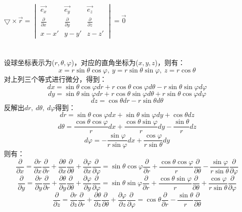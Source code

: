 \documentclass[10.5pt]{article}
\begin{document}
\subsection{}
$\bigtriangledown \times \vec{r} = 
\begin{vmatrix}
    \vec{e_x} & \vec{e_y} & \vec{e_z}\\
    \frac{\partial}{\partial x} & \frac{\partial}{\partial y} & \frac{\partial}{\partial z}\\
    x-x' & y-y' & z-z'
\end{vmatrix}
=\vec{0}
$

\section{}
设球坐标表示为($r,\theta,\varphi$)，对应的直角坐标为($x,y,z$)，则有：$$ x = r\sin \theta \cos \varphi, ~  y = r\sin \theta \sin \varphi, ~ z = r\cos \theta $$\indent 
对上列三个等式进行微分，得到：
$$dx = \sin \theta \cos \varphi dr + r\cos \theta \cos \varphi d\theta - r\sin \theta \sin \varphi d\varphi $$
$$dy = \sin \theta \sin \varphi dr + r\cos \theta \sin \varphi d\theta + r\sin \theta \cos \varphi d\varphi $$
$$dz = \cos \theta dr - r\sin \theta d\theta $$\indent
反解出$dr,~d\theta,~d\varphi$得到：
$$dr = \sin \theta \cos \varphi dx + \sin \theta \sin \varphi dy + \cos \theta dz$$
$$d\theta = \frac{\cos \theta \cos \varphi }{r}dx + \frac{\cos \theta \sin \varphi }{r}dy - \frac{\sin \theta}{r}dz$$
$$d\varphi = -\frac{\sin \varphi }{r\sin \varphi }dx + \frac{\cos \varphi }{r\sin \theta }dy$$\indent
则有：
$$\frac{\partial}{\partial x} = \frac{\partial r}{\partial x} \frac{\partial}{\partial r} + \frac{\partial \theta}{\partial x} \frac{\partial}{\partial \theta} + \frac{\partial \varphi}{\partial x} \frac{\partial}{\partial \varphi} = \sin \theta \cos \varphi \frac{\partial}{\partial r} + \frac{\cos \theta \cos \varphi }{r}\frac{\partial}{\partial \theta} - \frac{\sin \varphi}{r\sin \theta}\frac{\partial}{\partial \varphi }$$
$$\frac{\partial}{\partial y} = \frac{\partial r}{\partial y} \frac{\partial}{\partial r} + \frac{\partial \theta}{\partial y} \frac{\partial}{\partial \theta} + \frac{\partial \varphi}{\partial y} \frac{\partial}{\partial \varphi} = \sin \theta \sin \varphi \frac{\partial}{\partial r} + \frac{\cos \theta \sin \varphi }{r}\frac{\partial}{\partial \theta} + \frac{\cos \varphi}{r\sin \theta}\frac{\partial}{\partial \varphi}$$
$$\frac{\partial}{\partial z} = \frac{\partial r}{\partial z} \frac{\partial}{\partial r} + \frac{\partial \theta}{\partial z} \frac{\partial}{\partial \theta} + \frac{\partial \varphi}{\partial z} \frac{\partial}{\partial \varphi} = \cos \theta \frac{\partial}{\partial r} - \frac{\sin \theta}{r}\frac{\partial}{\partial \theta}$$
\end{document}
